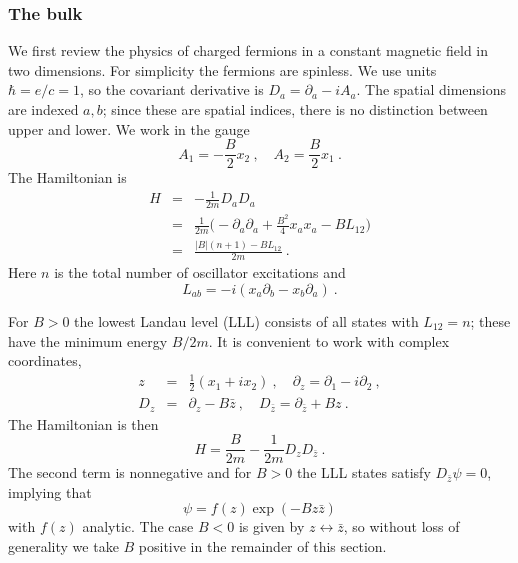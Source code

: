 \documentclass[a4paper,12pt]{article}
\begin{document}
\subsubsection{The bulk}

We first review the physics of charged fermions in a constant magnetic
field in two dimensions.  For simplicity the fermions are spinless.
We use units $\hbar = e/c = 1$, so the covariant derivative is $D_a =
\partial_a - i A_a$.  The spatial
dimensions are indexed $a,b$; since these are spatial indices, there is no
distinction between upper and lower.  We work in the gauge
\begin{equation}
A_1 = -\frac{B}{2} x_2\ ,\quad A_2 = \frac{B}{2} x_1\ .
\label{vectpot}
\end{equation}
The Hamiltonian is
\begin{eqnarray}
H &=& -\frac{1}{2m} D_a D_a \nonumber\\
&=& \frac{1}{2m} \biggl( -\partial_a \partial_a + \frac{B^2}{4} x_a
x_a - B L_{12} \biggr) \nonumber\\
&=& \frac{|B| (n + 1) - B L_{12}}{2m} 
\ .
\end{eqnarray}
Here $n$ is the total number of oscillator excitations and
\begin{equation}
L_{ab} =  -i(x_a \partial_b - x_b \partial_a)\ .
\end{equation}

For $B > 0$ the lowest Landau level (LLL)
consists of all states with $L_{12}=n$; these have the minimum energy
$B/2m$.
It is convenient to work with complex coordinates,
\begin{eqnarray}
z &=& \frac{1}{2}(x_1 + i x_2)\ , 
\quad\partial_z = \partial_1 - i\partial_2\ ,
\nonumber\\
D_z &=& \partial_z - B \bar z\ ,\quad
D_{\bar z} = \partial_{\bar z} + Bz\ .
\end{eqnarray}
The Hamiltonian is then
\begin{equation}
H = \frac{B}{2m} - \frac{1}{2m} D_z D_{\bar z}\ .
\end{equation}
The second term is nonnegative and for
$B > 0$ the LLL states satisfy $D_{\bar z} \psi = 0$, implying that
\begin{equation}
\psi = f(z) \exp(-B z \bar z)
\end{equation}
with $f(z)$ analytic.  The case $B < 0$ is given by $ z
\leftrightarrow \bar z$, so without loss of generality we take $B$ positive
in the remainder of this section.
\end{document}
